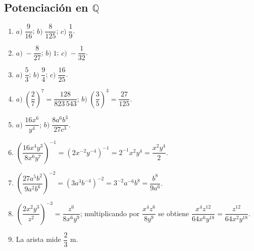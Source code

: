 \documentclass[12pt, letterpaper]{article}
\newcommand{\Q}{\mathbb{Q}}
\begin{document}
  \subsection*{Potenciación en $\Q$}
  \begin{enumerate}[leftmargin=*, label=\textbf{\arabic*.}]
    \item $a)\; \dfrac{9}{16}$; \quad $b)\; \dfrac{8}{125}$; \quad $c)\; \dfrac{1}{9}$.
    \item $a)\; -\dfrac{8}{27}$; \quad $b)\; 1$; \quad $c)\; -\dfrac{1}{32}$.
    \item $a)\; \dfrac{5}{3}$; \quad $b)\; \dfrac{9}{4}$; \quad $c)\; \dfrac{16}{25}$.
    \item $a)\; \left(\dfrac{2}{7}\right)^7 = \dfrac{128}{823\,543}$; \quad $b)\; \left(\dfrac{3}{5}\right)^3 = \dfrac{27}{125}$.
    \item $a)\; \dfrac{16x^6}{y^4}$; \quad $b)\; \dfrac{8a^6b^3}{27c^3}$.
    \item $\left(\dfrac{16x^4y^3}{8x^6y^7}\right)^{-1} = \left(2x^{-2}y^{-4}\right)^{-1} = 2^{-1}x^{2}y^{4} = \dfrac{x^2y^4}{2}$.
    \item $\left(\dfrac{27a^5b^2}{9a^2b^6}\right)^{-2} = \left(3a^3b^{-4}\right)^{-2} = 3^{-2}a^{-6}b^{8} = \dfrac{b^8}{9a^6}$.
    \item $\left(\dfrac{2x^2y^3}{z^2}\right)^{-3} = \dfrac{z^6}{8x^6y^9}$; multiplicando por $\dfrac{x^4z^6}{8y^9}$ se obtiene $\dfrac{x^4z^{12}}{64x^6y^{18}} = \dfrac{z^{12}}{64x^2y^{18}}$.
    \item La arista mide $\dfrac{2}{3}$ m.
  \end{enumerate}
\end{document}
